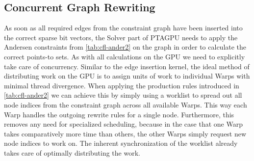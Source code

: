 \subsection{Concurrent Graph Rewriting}\label{sec:concurrgraph}
As soon as all required edges from the constraint graph have been inserted into the correct sparse bit vectors, the Solver part of PTAGPU needs to apply the Andersen constraints from \autoref{tab:cfl-ander2} on the graph in order to calculate the correct points-to sets.
As with all calculations on the GPU we need to explicitly take care of concurrency.
Similar to the edge insertion kernel, the ideal method of distributing work on the GPU is to assign units of work to individual Warps with minimal thread divergence.
When applying the production rules introduced in \autoref{tab:cfl-ander2} we can achieve this by simply using a worklist to spread out all node indices from the constraint graph across all available Warps.
This way each Warp handles the outgoing rewrite rules for a single node.
Furthermore, this removes any need for specialized scheduling, because in the case that one Warp takes comparatively more time than others, the other Warps simply request new node indices to work on.
The inherent synchronization of the worklist already takes care of optimally distributing the work.

